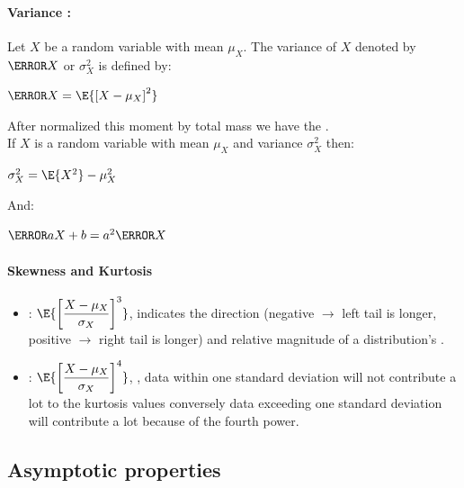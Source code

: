 \paragraph{Variance :}
Let $X$ be a random variable with mean $\mu_{X}$. The variance of $X$ 
denoted by $\V{X}$ or $\sigma_{X}^{2}$ is defined by:
\begin{center}
	$\V{X}=\E{\left[ X-\mu_{X} \right]^{2}}$
\end{center}
After normalized this moment by total mass we have the .\\
If $X$ is a random variable with mean $\mu_{X}$ and variance $\sigma_{X}^{2}$ then:
\begin{center}
$\sigma_{X}^{2}=\E{X^{2}}-\mu_{X}^{2}$
\end{center}
And:
\begin{center}
	$\V{aX+b}=a^{2}\V{X}$
\end{center}

\paragraph{Skewness and Kurtosis}
\begin{itemize}
    \item {}: $\E{\left[ \dfrac{X-\mu_{X}}{\sigma_{X}} \right]^{3}}$, indicates
        the direction (negative $\rightarrow$ left tail is longer, positive $\rightarrow$ 
        right tail is longer) and relative magnitude of a distribution's .
    \item {}: $\E{\left[ \dfrac{X-\mu_{X}}{\sigma_{X}} \right]^{4}}$, , data within one standard deviation will not contribute a lot to the 
        kurtosis values conversely data exceeding one standard deviation will contribute a
        lot because of the fourth power.
\end{itemize}


\subsection{Asymptotic properties}

